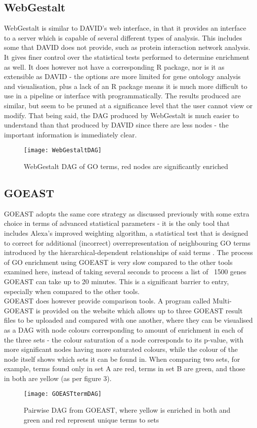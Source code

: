 \documentclass[11pt, oneside]{article}
\begin{document}
\subsection*{WebGestalt}
WebGestalt \cite{WebGestalt05} is similar to DAVID's web interface, in that it provides an interface to a server which is capable of several different types of analysis. This includes some that DAVID does not provide, such as protein interaction network analysis. It gives finer control over the statistical tests performed to determine enrichment as well. It does however not have a corresponding R package, nor is it as extensible as DAVID - the options are more limited for gene ontology analysis and visualisation, plus a lack of an R package means it is much more difficult to use in a pipeline or interface with programmatically. The results produced are similar, but seem to be pruned at a significance level that the user cannot view or modify. That being said, the DAG produced by WebGestalt is much easier to understand than that produced by DAVID since there are less nodes - the important information is immediately clear. 
\begin{figure}[h!]
	\texttt{[image: WebGestaltDAG]}
	\caption{WebGestalt DAG of GO terms, red nodes are significantly enriched}
\end{figure}

\subsection*{GOEAST}
GOEAST adopts the same core strategy as discussed previously with some extra choice in terms of advanced statistical parameters - it is the only tool that includes Alexa's improved weighting algorithm, a statistical test that is designed to correct for additional (incorrect) overrepresentation of neighbouring GO terms introduced by the hierarchical-dependent relationships of said terms \cite{GOEast08}. The process of GO enrichment using GOEAST is very slow compared to the other tools examined here, instead of taking several seconds to process a list of ~1500 genes GOEAST can take up to 20 minutes. This is a significant barrier to entry, especially when compared to the other tools.\\
GOEAST does however provide comparison tools. A program called Multi-GOEAST is provided on the website which allows up to three GOEAST result files to be uploaded and compared with one another, where they can be visualised as a DAG with node colours corresponding to amount of enrichment in each of the three sets - the colour saturation of a node corresponds to its p-value, with more significant nodes having more saturated colours, while the colour of the node itself shows which sets it can be found in. When comparing two sets, for example, terms found only in set A are red, terms in set B are green, and those in both are yellow (as per figure 3). 
\begin{figure}[h!]
	\texttt{[image: GOEASTtermDAG]}
	\caption{Pairwise DAG from GOEAST, where yellow is enriched in both and green and red represent unique terms to sets}
\end{figure}
\end{document}
